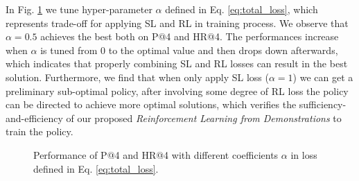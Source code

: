 In Fig. \ref{fig:coefficient} we tune hyper-parameter $\alpha$ defined in Eq. \ref{eq:total_loss},
which represents trade-off for applying SL and RL in training process.
We observe that $\alpha=0.5$ achieves the best both on P@4 and HR@4.
The performances increase when
$\alpha$ is tuned from 0 to the optimal value and then
drops down afterwards,
which indicates that properly combining SL and RL losses can result in the best solution.
Furthermore, we find that when only apply SL loss ($\alpha=1$) we can get a preliminary sub-optimal policy,
after involving some degree of RL loss the policy can be directed to achieve more optimal solutions,
which verifies the sufficiency-and-efficiency of our proposed \emph{Reinforcement Learning from Demonstrations} to train the policy.
\begin{figure}[th]
	\centering
	\caption{Performance of P@4 and HR@4 with different coefficients $\alpha$ in loss defined in Eq. \ref{eq:total_loss}.}
	\label{fig:coefficient}
\end{figure}